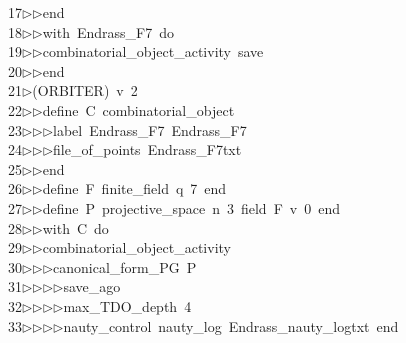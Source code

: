 \begin{tabbing}
17\>$\triangleright$\>$\triangleright$\>end\ \\[0pt]
18\>$\triangleright$\>$\triangleright$\>with\ Endrass\_F7\ do\ \\[0pt]
19\>$\triangleright$\>$\triangleright$\>combinatorial\_object\_activity\ save\ \\[0pt]
20\>$\triangleright$\>$\triangleright$\>end\\[0pt]
21\>$\triangleright$\>(ORBITER)\ v\ 2\ \\[0pt]
22\>$\triangleright$\>$\triangleright$\>define\ C\ combinatorial\_object\ \\[0pt]
23\>$\triangleright$\>$\triangleright$\>$\triangleright$\>label\ Endrass\_F7\ Endrass\_F7\ \\[0pt]
24\>$\triangleright$\>$\triangleright$\>$\triangleright$\>file\_of\_points\ Endrass\_F7txt\ \\[0pt]
25\>$\triangleright$\>$\triangleright$\>end\ \\[0pt]
26\>$\triangleright$\>$\triangleright$\>define\ F\ finite\_field\ q\ 7\ end\ \\[0pt]
27\>$\triangleright$\>$\triangleright$\>define\ P\ projective\_space\ n\ 3\ field\ F\ v\ 0\ end\ \\[0pt]
28\>$\triangleright$\>$\triangleright$\>with\ C\ do\ \\[0pt]
29\>$\triangleright$\>$\triangleright$\>combinatorial\_object\_activity\ \\[0pt]
30\>$\triangleright$\>$\triangleright$\>$\triangleright$\>canonical\_form\_PG\ P\ \\[0pt]
31\>$\triangleright$\>$\triangleright$\>$\triangleright$\>$\triangleright$\>save\_ago\ \\[0pt]
32\>$\triangleright$\>$\triangleright$\>$\triangleright$\>$\triangleright$\>max\_TDO\_depth\ 4\ \\[0pt]
33\>$\triangleright$\>$\triangleright$\>$\triangleright$\>$\triangleright$\>nauty\_control\ nauty\_log\ Endrass\_nauty\_logtxt\ end\ \\[0pt]

\end{tabbing}

